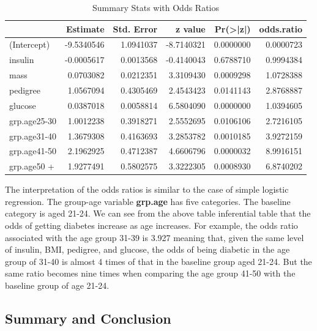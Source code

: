 \documentclass[
]{book}
\begin{document}
\begin{table}

\caption{\label{tab:unnamed-chunk-125}Summary Stats with Odds Ratios}
\centering
\begin{tabular}[t]{l|r|r|r|r|r}
\hline
  & Estimate & Std. Error & z value & Pr(>|z|) & odds.ratio\\
\hline
(Intercept) & -9.5340546 & 1.0941037 & -8.7140321 & 0.0000000 & 0.0000723\\
\hline
insulin & -0.0005617 & 0.0013568 & -0.4140043 & 0.6788710 & 0.9994384\\
\hline
mass & 0.0703082 & 0.0212351 & 3.3109430 & 0.0009298 & 1.0728388\\
\hline
pedigree & 1.0567094 & 0.4305469 & 2.4543423 & 0.0141143 & 2.8768887\\
\hline
glucose & 0.0387018 & 0.0058814 & 6.5804090 & 0.0000000 & 1.0394605\\
\hline
grp.age25-30 & 1.0012238 & 0.3918271 & 2.5552695 & 0.0106106 & 2.7216105\\
\hline
grp.age31-40 & 1.3679308 & 0.4163693 & 3.2853782 & 0.0010185 & 3.9272159\\
\hline
grp.age41-50 & 2.1962925 & 0.4712387 & 4.6606796 & 0.0000032 & 8.9916151\\
\hline
grp.age50 + & 1.9277491 & 0.5802575 & 3.3222305 & 0.0008930 & 6.8740202\\
\hline
\end{tabular}
\end{table}

The interpretation of the odds ratios is similar to the case of simple logistic regression. The group-age variable \textbf{grp.age} has five categories. The baseline category is aged 21-24. We can see from the above table inferential table that the odds of getting diabetes increase as age increases. For example, the odds ratio associated with the age group 31-39 is 3.927 meaning that, given the same level of insulin, BMI, pedigree, and glucose, the odds of being diabetic in the age group of 31-40 is almost 4 times of that in the baseline group aged 21-24. But the same ratio becomes nine times when comparing the age group 41-50 with the baseline group of age 21-24.

\hypertarget{summary-and-conclusion}{%
\subsection{Summary and Conclusion}\label{summary-and-conclusion}}
\end{document}

